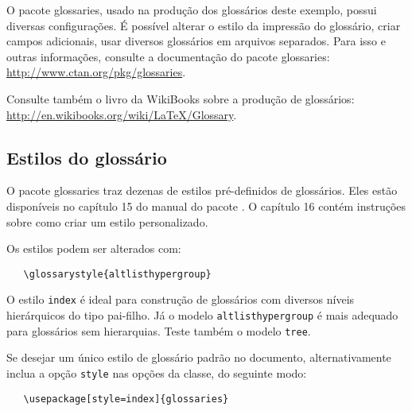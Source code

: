 \documentclass[12pt,openright,twoside,a4paper]{abntex2}
\begin{document}
O pacote \textsf{glossaries}, usado na produção dos glossários deste exemplo,
possui diversas configurações. É possível alterar o estilo da impressão do
glossário, criar campos adicionais, usar diversos glossários em
arquivos separados. Para isso e outras informações, consulte a documentação do
pacote \textsf{glossaries}: \url{http://www.ctan.org/pkg/glossaries}.

Consulte também o livro da WikiBooks sobre a produção de glossários:
\url{http://en.wikibooks.org/wiki/LaTeX/Glossary}.
 

\subsection{Estilos do glossário}

O pacote \textsf{glossaries} traz dezenas de estilos pré-definidos de
glossários. Eles estão disponíveis no capítulo 15 do manual do pacote
\cite{talbot2012}. O capítulo 16 contém instruções sobre como criar um estilo
personalizado.

Os estilos podem ser alterados com:

\begin{verbatim}
   \glossarystyle{altlisthypergroup}
\end{verbatim}

O estilo \texttt{index} é ideal para construção de glossários com diversos
níveis hierárquicos do tipo pai-filho. Já o modelo \texttt{altlisthypergroup} é
mais adequado para glossários sem hierarquias. Teste também o modelo
\texttt{tree}.

Se desejar um único estilo de glossário padrão no documento, alternativamente
inclua a opção \texttt{style} nas opções da classe, do
seguinte modo:

\begin{verbatim}
   \usepackage[style=index]{glossaries}
\end{verbatim}




 
 
\postextual
 
 

 
\end{document}
